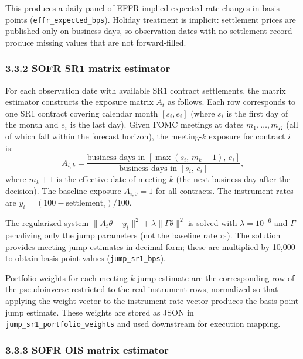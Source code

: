 This produces a daily panel of EFFR-implied expected rate changes in basis points (\texttt{effr\_expected\_bps}). Holiday treatment is implicit: settlement prices are published only on business days, so observation dates with no settlement record produce missing values that are not forward-filled.

\subsubsection*{3.3.2 SOFR SR1 matrix estimator}

For each observation date with available SR1 contract settlements, the matrix estimator constructs the exposure matrix $A_t$ as follows. Each row corresponds to one SR1 contract covering calendar month $[s_i, e_i]$ (where $s_i$ is the first day of the month and $e_i$ is the last day). Given FOMC meetings at dates $m_1, \ldots, m_K$ (all of which fall within the forecast horizon), the meeting-$k$ exposure for contract $i$ is:
\[
A_{i,k} = \frac{\text{business days in } [\max(s_i,\, m_k + 1),\, e_i]}{\text{business days in } [s_i,\, e_i]},
\]
where $m_k + 1$ is the effective date of meeting $k$ (the next business day after the decision). The baseline exposure $A_{i,0} = 1$ for all contracts. The instrument rates are $y_i = (100 - \text{settlement}_i)/100$.

The regularized system $\|A_t\theta - y_t\|^2 + \lambda \|\Gamma\theta\|^2$ is solved with $\lambda = 10^{-6}$ and $\Gamma$ penalizing only the jump parameters (not the baseline rate $r_0$). The solution provides meeting-jump estimates in decimal form; these are multiplied by 10,000 to obtain basis-point values (\texttt{jump\_sr1\_bps}).

Portfolio weights for each meeting-$k$ jump estimate are the corresponding row of the pseudoinverse restricted to the real instrument rows, normalized so that applying the weight vector to the instrument rate vector produces the basis-point jump estimate. These weights are stored as JSON in \texttt{jump\_sr1\_portfolio\_weights} and used downstream for execution mapping.

\subsubsection*{3.3.3 SOFR OIS matrix estimator}

